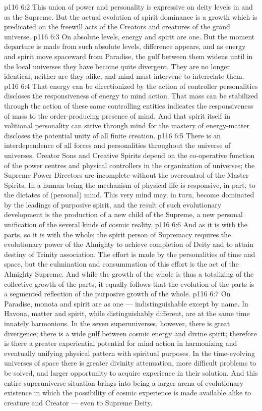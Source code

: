 \vs p116 6:2 This union of power and personality is expressive on deity levels in and as the Supreme. But the actual evolution of spirit dominance is a growth which is predicated on the freewill acts of the Creators and creatures of the grand universe.
\vs p116 6:3 \pc On absolute levels, energy and spirit are one. But the moment departure is made from such absolute levels, difference appears, and as energy and spirit move spaceward from Paradise, the gulf between them widens until in the local universes they have become quite divergent. They are no longer identical, neither are they alike, and mind must intervene to interrelate them.
\vs p116 6:4 \pc That energy can be directionized by the action of controller personalities discloses the responsiveness of energy to mind action. That mass can be stabilized through the action of these same controlling entities indicates the responsiveness of mass to the order\hyp{}producing presence of mind. And that spirit itself in volitional personality can strive through mind for the mastery of energy\hyp{}matter discloses the potential unity of all finite creation.
\vs p116 6:5 There is an interdependence of all forces and personalities throughout the universe of universes. Creator Sons and Creative Spirits depend on the co\hyp{}operative function of the power centres and physical controllers in the organization of universes; the Supreme Power Directors are incomplete without the overcontrol of the Master Spirits. In a human being the mechanism of physical life is responsive, in part, to the dictates of (personal) mind. This very mind may, in turn, become dominated by the leadings of purposive spirit, and the result of such evolutionary development is the production of a new child of the Supreme, a new personal unification of the several kinds of cosmic reality.
\vs p116 6:6 And as it is with the parts, so it is with the whole; the spirit person of Supremacy requires the evolutionary power of the Almighty to achieve completion of Deity and to attain destiny of Trinity association. The effort is made by the personalities of time and space, but the culmination and consummation of this effort is the act of the Almighty Supreme. And while the growth of the whole is thus a totalizing of the collective growth of the parts, it equally follows that the evolution of the parts is a segmented reflection of the purposive growth of the whole.
\vs p116 6:7 On Paradise, monota and spirit are as one --- indistinguishable except by name. In Havona, matter and spirit, while distinguishably different, are at the same time innately harmonious. In the seven superuniverses, however, there is great divergence; there is a wide gulf between cosmic energy and divine spirit; therefore is there a greater experiential potential for mind action in harmonizing and eventually unifying physical pattern with spiritual purposes. In the time\hyp{}evolving universes of space there is greater divinity attenuation, more difficult problems to be solved, and larger opportunity to acquire experience in their solution. And this entire superuniverse situation brings into being a larger arena of evolutionary existence in which the possibility of cosmic experience is made available alike to creature and Creator --- even to Supreme Deity.
